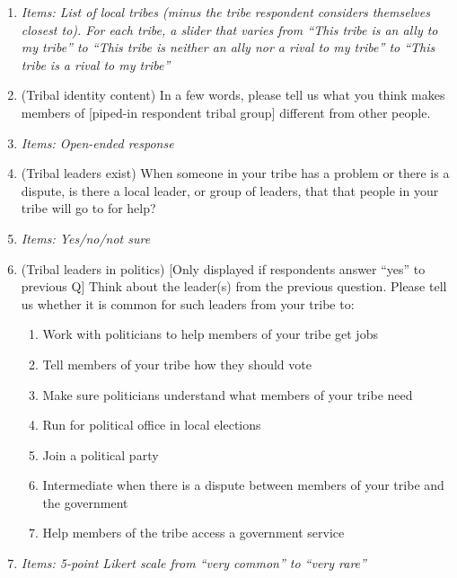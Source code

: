 \documentclass[12pt]{article}
\newcommand{\alerta}[1]{\textcolor{harvardcrimson}{#1}}
\begin{document}
\begin{enumerate}
    \item[] \textit{Items:  List of local tribes (minus the tribe respondent considers themselves closest to). For each tribe, a slider that varies from “This tribe is an ally to my tribe” to “This tribe is neither an ally nor a rival to my tribe” to ``This tribe is a rival to my tribe''
}
    
     \item \alerta{(Tribal identity content)}  In a few words, please tell us what you think makes members of [piped-in respondent tribal group] different from other people.
    \item[] \textit{Items: Open-ended response}
    
     \item \alerta{(Tribal leaders exist)} When someone in your tribe has a problem or there is a dispute, is there a local leader, or group of leaders, that that people in your tribe will go to for help?
    \item[] \textit{Items: Yes/no/not sure}
    
     \item \alerta{(Tribal leaders in politics)} [Only displayed if respondents answer ``yes'' to previous Q]  Think about the leader(s) from the previous question. Please tell us whether it is common for such leaders from your tribe to:
     \begin{enumerate}
         \item Work with politicians to help members of your tribe get jobs 
         \item Tell members of your tribe how they should vote
         \item Make sure politicians understand what members of your tribe need
         \item Run for political office in local elections
         \item Join a political party
         \item Intermediate when there is a dispute between members of your tribe and the government 
         \item Help members of the tribe access a government service
     \end{enumerate}
    \item[] \textit{Items: 5-point Likert scale from ``very common'' to ``very rare''}
    

\end{enumerate}
\end{document}
